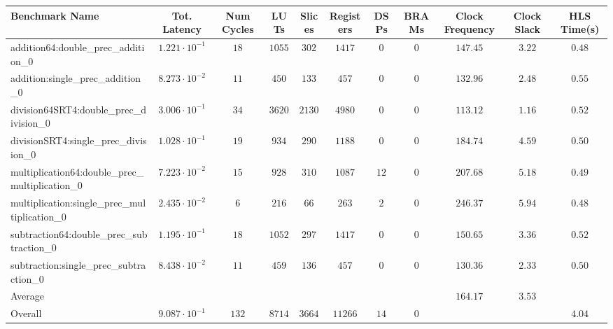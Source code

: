 \begin{tabular}{|l|c|c|c|c|c|c|c|c|c|c|}
\hline
Benchmark Name                                   & Tot. Latency            & Num Cycles & LUTs     & Slices   & Registers & DSPs   & BRAMs & Clock Frequency & Clock Slack & HLS Time(s) \\
\hline
addition64:double\_prec\_addition\_0             & $ 1.221 \cdot 10^{-1} $ & $ 18     $ & $ 1055 $ & $ 302  $ & $ 1417  $ & $ 0  $ & $ 0 $ & $ 147.45      $ & $ 3.22    $ & $ 0.48    $ \\
addition:single\_prec\_addition\_0               & $ 8.273 \cdot 10^{-2} $ & $ 11     $ & $ 450  $ & $ 133  $ & $ 457   $ & $ 0  $ & $ 0 $ & $ 132.96      $ & $ 2.48    $ & $ 0.55    $ \\
division64SRT4:double\_prec\_division\_0         & $ 3.006 \cdot 10^{-1} $ & $ 34     $ & $ 3620 $ & $ 2130 $ & $ 4980  $ & $ 0  $ & $ 0 $ & $ 113.12      $ & $ 1.16    $ & $ 0.52    $ \\
divisionSRT4:single\_prec\_division\_0           & $ 1.028 \cdot 10^{-1} $ & $ 19     $ & $ 934  $ & $ 290  $ & $ 1188  $ & $ 0  $ & $ 0 $ & $ 184.74      $ & $ 4.59    $ & $ 0.50    $ \\
multiplication64:double\_prec\_multiplication\_0 & $ 7.223 \cdot 10^{-2} $ & $ 15     $ & $ 928  $ & $ 310  $ & $ 1087  $ & $ 12 $ & $ 0 $ & $ 207.68      $ & $ 5.18    $ & $ 0.49    $ \\
multiplication:single\_prec\_multiplication\_0   & $ 2.435 \cdot 10^{-2} $ & $ 6      $ & $ 216  $ & $ 66   $ & $ 263   $ & $ 2  $ & $ 0 $ & $ 246.37      $ & $ 5.94    $ & $ 0.48    $ \\
subtraction64:double\_prec\_subtraction\_0       & $ 1.195 \cdot 10^{-1} $ & $ 18     $ & $ 1052 $ & $ 297  $ & $ 1417  $ & $ 0  $ & $ 0 $ & $ 150.65      $ & $ 3.36    $ & $ 0.52    $ \\
subtraction:single\_prec\_subtraction\_0         & $ 8.438 \cdot 10^{-2} $ & $ 11     $ & $ 459  $ & $ 136  $ & $ 457   $ & $ 0  $ & $ 0 $ & $ 130.36      $ & $ 2.33    $ & $ 0.50    $ \\
\hline
Average                                          & $                     $ & $        $ & $      $ & $      $ & $       $ & $    $ & $   $ & $ 164.17      $ & $ 3.53    $ & $         $ \\
\hline
Overall                                          & $ 9.087 \cdot 10^{-1} $ & $ 132    $ & $ 8714 $ & $ 3664 $ & $ 11266 $ & $ 14 $ & $ 0 $ & $             $ & $         $ & $ 4.04    $ \\
\hline
\end{tabular}

